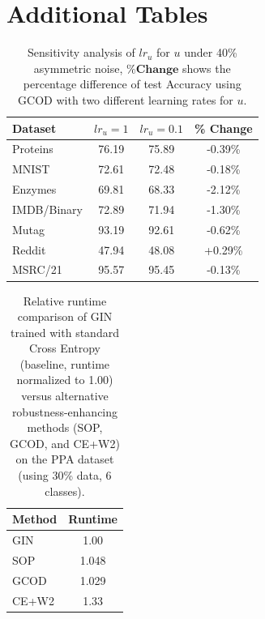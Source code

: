 \section{Additional Tables}
\begin{table}[htbp]
  \caption{Sensitivity analysis of $lr_u$ for $u$ under 40\% asymmetric noise, $\% \textbf{Change}$ shows the percentage difference of test Accuracy using GCOD with two different learning rates for $u$.}
    \label{tab:lr_sensitivity}
    \centering
    \begin{tabular}{lccc}
        \hline
        \textbf{Dataset} & \textbf{$lr_u=1$} & \textbf{$lr_u=0.1$} & \textbf{\% Change} \\
        \hline
        Proteins    & 76.19 & 75.89 & -0.39\% \\
        MNIST       & 72.61 & 72.48 & -0.18\% \\
        Enzymes     & 69.81 & 68.33 & -2.12\% \\
        IMDB/Binary & 72.89 & 71.94 & -1.30\% \\
        Mutag       & 93.19 & 92.61 & -0.62\% \\
        Reddit      & 47.94 & 48.08 & +0.29\% \\
        MSRC/21     & 95.57 & 95.45 & -0.13\% \\
        \hline
    \end{tabular}
\end{table}
\begin{table}[htbp]
        \caption{Relative runtime comparison of GIN trained with standard Cross Entropy (baseline, runtime normalized to 1.00) versus alternative robustness-enhancing methods (SOP, GCOD, and CE+W2) on the PPA dataset (using 30\% data, 6 classes).}
        \label{tab:runtime_comparison}
        \centering
        \begin{tabular}{lc}
            \hline
            \textbf{Method} & \textbf{Runtime} \\
            \hline
            GIN  & 1.00 \\
            SOP  & 1.048 \\
            GCOD & 1.029 \\
            CE+W2 & 1.33 \\
            \hline
        \end{tabular}
\end{table}
